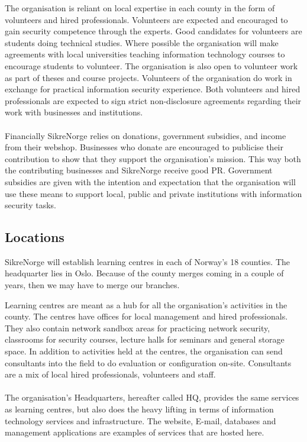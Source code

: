 The organisation is reliant on local expertise in each county in the form of volunteers and hired professionals. Volunteers are expected and encouraged to gain security competence through the experts. Good candidates for volunteers are students doing technical studies. Where possible the organisation will make agreements with local universities teaching information technology courses to encourage students to volunteer. The organisation is also open to volunteer work as part of theses and course projects. Volunteers of the organisation do work in exchange for practical information security experience. Both volunteers and hired professionals are expected to sign strict non-disclosure agreements regarding their work with businesses and institutions.
\\
\\
Financially SikreNorge relies on donations, government subsidies, and income from their webshop. Businesses who donate are encouraged to publicise their contribution to show that they support the organisation's mission. This way both the contributing businesses and SikreNorge receive good PR. Government subsidies are given with the intention and expectation that the organisation will use these means to support local, public and private institutions with information security tasks.

\subsection{Locations}

SikreNorge will establish learning centres in each of Norway's 18 counties. The headquarter lies in Oslo. Because of the county merges coming in a couple of years, then we may have to merge our branches.

Learning centres are meant as a hub for all the organisation's activities in the county. The centres have offices for local management and hired professionals. They also contain network sandbox areas for practicing network security, classrooms for security courses, lecture halls for seminars and general storage space. In addition to activities held at the centres, the organisation can send consultants into the field to do evaluation or configuration on-site. Consultants are a mix of local hired professionals, volunteers and staff.
\\
\\
The organisation's Headquarters, hereafter called HQ, provides the same services as learning centres, but also does the heavy lifting in terms of information technology services and infrastructure. The website, E-mail, databases and management applications are examples of services that are hosted here.

